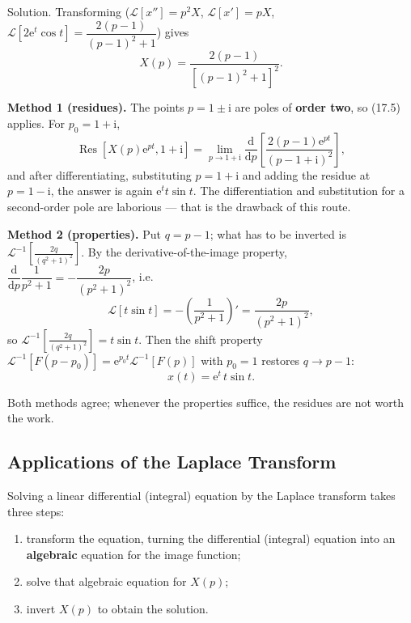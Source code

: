\documentclass[11pt,a4paper]{article}
\theoremstyle{definition}
\theoremstyle{plain}
\begin{document}
Solution. Transforming ($\mathcal{L}[x'']=p^2X$, $\mathcal{L}[x']=pX$,
$\mathcal{L}\left[2\mathrm{e}^{t}\cos t\right]=\dfrac{2(p-1)}{(p-1)^2+1}$) gives
\begin{equation*}
X(p)=\frac{2(p-1)}{\left[(p-1)^2+1\right]^2} .
\end{equation*}

\textbf{Method 1 (residues).} The points $p=1\pm\mathrm{i}$ are poles of \textbf{order two}, so
(17.5) applies. For $p_0=1+\mathrm{i}$,
\begin{equation*}
\operatorname{Res}\left[X(p)\mathrm{e}^{pt},1+\mathrm{i}\right]
=\lim_{p\to 1+\mathrm{i}}\frac{\mathrm{d}}{\mathrm{d}p}\left[
\frac{2(p-1)\mathrm{e}^{pt}}{\left(p-1+\mathrm{i}\right)^2}\right],
\end{equation*}
and after differentiating, substituting $p=1+\mathrm{i}$ and adding the residue at
$p=1-\mathrm{i}$, the answer is again $\mathrm{e}^{t}t\sin t$. The differentiation and substitution
for a second-order pole are laborious --- that is the drawback of this route.

\textbf{Method 2 (properties).} Put $q=p-1$; what has to be inverted is
$\mathcal{L}^{-1}\left[\frac{2q}{\left(q^2+1\right)^2}\right]$. By the derivative-of-the-image
property, $\dfrac{\mathrm{d}}{\mathrm{d}p}\dfrac{1}{p^2+1}
=-\dfrac{2p}{\left(p^2+1\right)^2}$, i.e.
\begin{equation*}
\mathcal{L}\left[t\sin t\right]=-\left(\frac{1}{p^2+1}\right)'
=\frac{2p}{\left(p^2+1\right)^2},
\end{equation*}
so $\mathcal{L}^{-1}\left[\frac{2q}{\left(q^2+1\right)^2}\right]=t\sin t$. Then the shift property
$\mathcal{L}^{-1}\left[F(p-p_0)\right]=\mathrm{e}^{p_0 t}\mathcal{L}^{-1}\left[F(p)\right]$ with
$p_0=1$ restores $q\to p-1$:
\begin{equation*}
x(t)=\mathrm{e}^{t}\,t\sin t .
\end{equation*}

Both methods agree; whenever the properties suffice, the residues are not worth the work.

\clearpage
\setlength{\parskip}{4pt plus 1pt}
\setlength{\abovedisplayskip}{5pt plus 1pt minus 1pt}
\setlength{\belowdisplayskip}{5pt plus 1pt minus 1pt}
\subsection{Applications of the Laplace Transform}

Solving a linear differential (integral) equation by the Laplace transform takes three steps:
\begin{enumerate}\setlength{\itemsep}{2pt}\setlength{\topsep}{3pt}
    \item transform the equation, turning the differential (integral) equation into an
          \textbf{algebraic} equation for the image function;
    \item solve that algebraic equation for $X(p)$;
    \item invert $X(p)$ to obtain the solution.
\end{enumerate}
\end{document}
